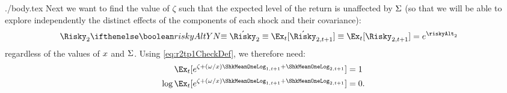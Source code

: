 \documentclass{handout}
\begin{document}
\begin{verbatimwrite}{./body.tex}
Next we want to find the value of $\zeta$ such that the expected level of the return is unaffected by $\Sigma$ (so
that we will be able to explore independently the distinct effects of the
components of each shock and their covariance):
\begin{equation}\begin{gathered}\begin{aligned}
  \Risky_{2} \ifriskyAlt{\equiv \acute{\Risky}_{2} \equiv \Ex_{t}[\acute{\Risky}_{2,t+1}]}{}\equiv  \Ex_{t}[\Risky_{2,t+1}] & =  e^{\riskyAlt_{2}}
\end{aligned}\end{gathered}\end{equation}
regardless of the values of $x$ and $\Sigma$.  Using \eqref{eq:r2tp1CheckDef}, we therefore need:
\begin{equation}\begin{gathered}\begin{aligned}
         \Ex_{t}[e^{\zeta+ (\omega/\scale)\ShkMeanOneLog_{1,t+1}  + \ShkMeanOneLog_{2,t+1}}] & =  1
\\ \log  \Ex_{t}[e^{\zeta+ (\omega/\scale)\ShkMeanOneLog_{1,t+1}  + \ShkMeanOneLog_{2,t+1}}] & =  0.
\end{aligned}\end{gathered}\end{equation}


\end{verbatimwrite}
\end{document}
